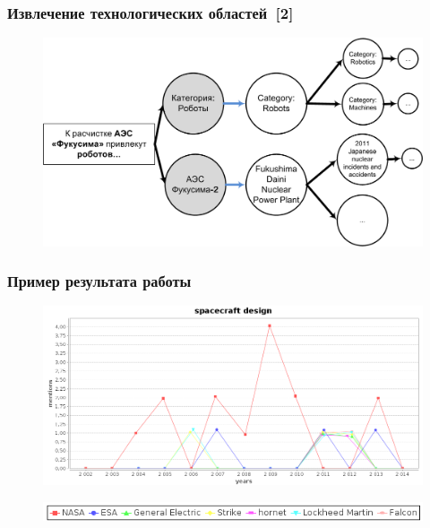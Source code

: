 \documentclass{beamer}
\begin{document}
\begin{frame}\frametitle{Извлечение технологических областей~[2]}

\begin{figure}[ht]
\begin{center}
\includegraphics[width=4.5in]{Process.png}
\end{center}
\end{figure}

\end{frame}

\begin{frame}\frametitle{Пример результата работы}
\begin{figure}[ht]
\begin{center}
\includegraphics[width=4.5in]{space2.png}
\end{center}
\end{figure}
\begin{figure}[ht]
\begin{center}
\includegraphics[width=4.5in]{big_names.png}
\end{center}
\end{figure}
\end{frame}
\end{document}
